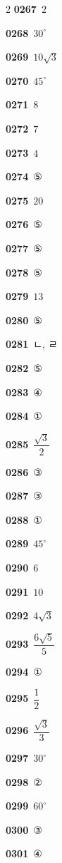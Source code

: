 \documentclass[10pt,a4paper]{article}
\begin{document}
\begin{multicols}{2}
\noindent\textbf{0267}\ $2$\par
\noindent\textbf{0268}\ $30^\circ$\par
\noindent\textbf{0269}\ $10\sqrt{3}$\par
\noindent\textbf{0270}\ $45^\circ$\par
\noindent\textbf{0271}\ $8$\par
\noindent\textbf{0272}\ $7$\par
\noindent\textbf{0273}\ $4$\par
\noindent\textbf{0274}\ ⑤\par
\noindent\textbf{0275}\ $20$\par
\noindent\textbf{0276}\ ⑤\par
\noindent\textbf{0277}\ ⑤\par
\noindent\textbf{0278}\ ⑤\par
\noindent\textbf{0279}\ $13$\par
\noindent\textbf{0280}\ ⑤\par
\noindent\textbf{0281}\ ㄴ, ㄹ\par
\noindent\textbf{0282}\ ⑤\par
\noindent\textbf{0283}\ ④\par
\noindent\textbf{0284}\ ①\par
\noindent\textbf{0285}\ $\dfrac{\sqrt{3}}{2}$\par
\noindent\textbf{0286}\ ③\par
\noindent\textbf{0287}\ ③\par
\noindent\textbf{0288}\ ①\par
\noindent\textbf{0289}\ $45^\circ$\par
\noindent\textbf{0290}\ $6$\par
\noindent\textbf{0291}\ $10$\par
\noindent\textbf{0292}\ $4\sqrt{3}$\par
\noindent\textbf{0293}\ $\dfrac{6\sqrt{5}}{5}$\par
\noindent\textbf{0294}\ ①\par
\noindent\textbf{0295}\ $\dfrac{1}{2}$\par
\noindent\textbf{0296}\ $\dfrac{\sqrt{3}}{3}$\par
\noindent\textbf{0297}\ $30^\circ$\par
\noindent\textbf{0298}\ ②\par
\noindent\textbf{0299}\ $60^\circ$\par
\noindent\textbf{0300}\ ③\par
\noindent\textbf{0301}\ ④\par

\end{multicols}
\end{document}
